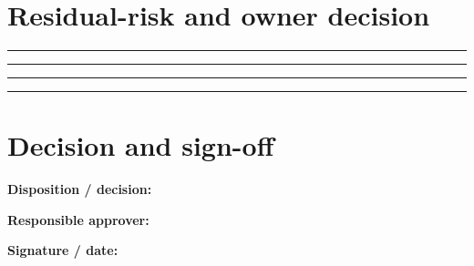 \documentclass[10pt,letterpaper]{article}
\begin{document}
\section{Residual-risk and owner decision}
\noindent\rule{\linewidth}{0.4pt}\par\vspace{16pt}
\noindent\rule{\linewidth}{0.4pt}\par\vspace{16pt}
\noindent\rule{\linewidth}{0.4pt}\par\vspace{16pt}
\noindent\rule{\linewidth}{0.4pt}\par\vspace{16pt}
\section{Decision and sign-off}
\noindent\textbf{Disposition / decision:}\quad\hrulefill\par\vspace{11pt}
\noindent\textbf{Responsible approver:}\quad\hrulefill\par\vspace{11pt}
\noindent\textbf{Signature / date:}\quad\hrulefill\par\vspace{11pt}
\end{document}
